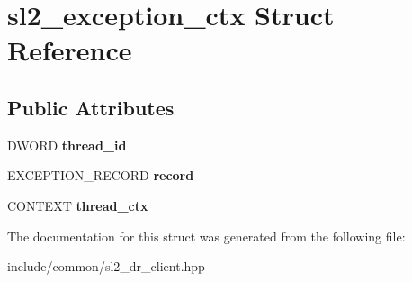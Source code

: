 \hypertarget{structsl2__exception__ctx}{}\section{sl2\+\_\+exception\+\_\+ctx Struct Reference}
\label{structsl2__exception__ctx}
\subsection*{Public Attributes}
\begin{DoxyCompactItemize}
\item 
\mbox{\label{structsl2__exception__ctx_a1d795583a336021a388a619a9ca91976}} 
D\+W\+O\+RD {\bfseries thread\+\_\+id}
\item 
\mbox{\label{structsl2__exception__ctx_a829e701eb17b93d627f92d731a85ab43}} 
E\+X\+C\+E\+P\+T\+I\+O\+N\+\_\+\+R\+E\+C\+O\+RD {\bfseries record}
\item 
\mbox{\label{structsl2__exception__ctx_a43e5a6b02a48937a58b58a7d41d77504}} 
C\+O\+N\+T\+E\+XT {\bfseries thread\+\_\+ctx}
\end{DoxyCompactItemize}


The documentation for this struct was generated from the following file\+:\begin{DoxyCompactItemize}
\item 
include/common/sl2\+\_\+dr\+\_\+client.\+hpp\end{DoxyCompactItemize}
